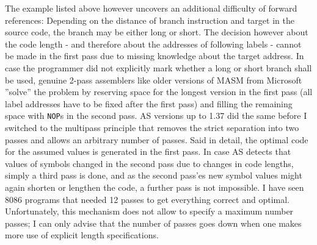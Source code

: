 \documentclass[12pt,twoside]{report}
\newcommand{\tty}[1]{{\tt #1}}
\newcommand{\asname}{{AS}}
\begin{document}
The example listed above however uncovers an additional difficulty of
forward references: Depending on the distance of branch instruction
and target in the source code, the branch may be either long or
short.  The decision however about the code length - and therefore
about the addresses of following labels - cannot be made in the first
pass due to missing knowledge about the target address.  In case the
programmer did not explicitly mark whether a long or short branch
shall be used, genuine 2-pass assemblers like older versions of MASM
from Microsoft ''solve'' the problem by reserving space for the longest
version in the first pass (all label addresses have to be fixed after
the first pass) and filling the remaining space with \tty{NOP}s in the
second pass.  \asname{} versions up to 1.37 did the same before I switched
to the multipass principle that removes the strict separation into
two passes and allows an arbitrary number of passes.  Said in detail,
the optimal code for the assumed values is generated in the first
pass.  In case \asname{} detects that values of symbols changed in the second
pass due to changes in code lengths, simply a third pass is done, and
as the second pass'es new symbol values might again shorten or
lengthen the code, a further pass is not impossible.  I have seen
8086 programs that needed 12 passes to get everything correct and
optimal.  Unfortunately, this mechanism does not allow to specify a
maximum number passes; I can only advise that the number of passes
goes down when one makes more use of explicit length specifications.
\end{document}
